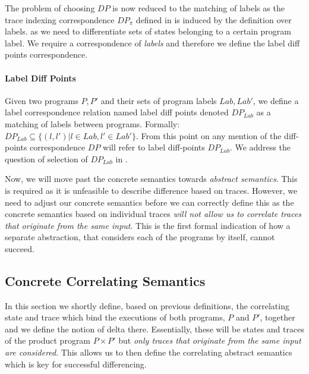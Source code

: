 The problem of choosing $DP$ is now reduced to the matching of labels as the trace indexing correspondence $DP_{\pi}$ defined in  is induced by the definition over labels. as we need to differentiate sets of states belonging to a certain program label. We require a correspondence of \emph{labels} and therefore we define the label diff points correspondence.

\paragraph{Label Diff Points} 
Given two programs $P,P'$ and their sets of program labels $Lab,Lab'$, we define a label correspondence relation named label diff points denoted $DP_{Lab}$ as a matching of labels between programs. Formally: $DP_{Lab} \subseteq \{(l,l')|l \in Lab, l' \in Lab'\}$. From this point on any mention of the diff-points correspondence $DP$ will refer to label diff-points $DP_{Lab}$. We address the question of selection of $DP_{Lab}$ in . %

Now, we will move past the concrete semantics towards \emph{abstract semantics}. This is required as it is unfeasible to describe difference based on traces. However, we need to adjust our concrete semantics before we can correctly define this as the concrete semantics based on individual traces \emph{will not allow us to correlate traces that originate from the same input}. This is the first formal indication of how a separate abstraction, that considers each of the programs by itself, cannot succeed.

\subsection{Concrete Correlating Semantics} 

In this section we shortly define, based on previous definitions, the correlating state and trace which bind the executions of both programs, $P$ and $P'$, together and we define the notion of delta there. Essentially, these will be states and traces of the product program $P \times P'$ but \emph{only traces that originate from the same input are considered}. This allows us to then define the correlating abstract semantics which is key for successful differencing.

